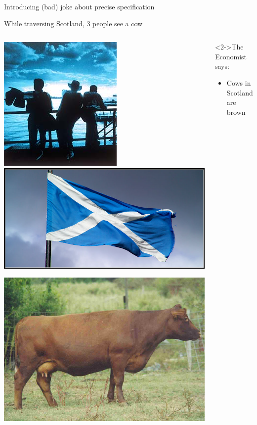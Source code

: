 \begin{frame}{Introducing (bad) joke about precise specification}
  \begin{block}{While traversing Scotland, 3 people see a cow}\medskip
    \begin{columns}
      \begin{column}{.55\linewidth}
        \includegraphics[width=.3\linewidth]{img/proof_guys.png}\hfill
        \includegraphics[width=.6\linewidth]{img/proof_scotland.png}
        
        \includegraphics[width=\linewidth]{img/proof_cow.png}
      \end{column}

      \begin{column}{.45\linewidth}
        \begin{block}<2->{The Economist says:}
          \begin{itemize}
          \item Cows in Scotland are brown
          \end{itemize}
        \end{block}


\end{column}
\end{columns}
\end{block}
\end{frame}

